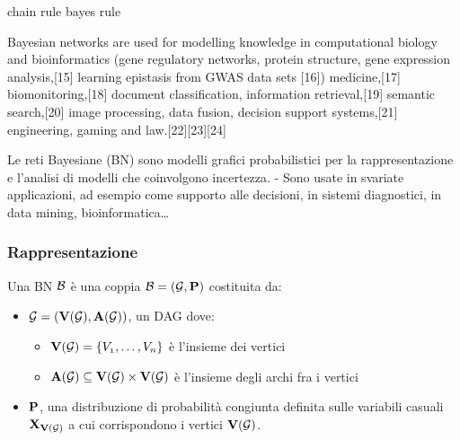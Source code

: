 chain rule
bayes rule

Bayesian networks are used for modelling knowledge in computational biology and bioinformatics (gene regulatory networks, protein structure, gene expression analysis,[15] learning epistasis from GWAS data sets [16]) medicine,[17] biomonitoring,[18] document classification, information retrieval,[19] semantic search,[20] image processing, data fusion, decision support systems,[21] engineering, gaming and law.[22][23][24]

Le reti Bayesiane (BN) sono modelli grafici probabilistici 
per la rappresentazione e l’analisi di modelli che 
coinvolgono incertezza. 
- Sono usate in svariate applicazioni, ad esempio come 
supporto alle decisioni, in sistemi diagnostici, in data 
mining, bioinformatica… 

\subsubsection{Rappresentazione}

\begin{definizione}[\acl{BN}]
Una \acl{BN} $\mathcal{B}$ è una coppia $\mathcal{B}=(\mathcal{G}, \mathbf{P})$ costituita da:
\begin{itemize}
    \item $\mathcal{G}=(\mathbf{V}(\mathcal{G}),\mathbf{A}(\mathcal{G}))$, un \acl{DAG} dove:
    \begin{itemize}
        \item $\mathbf{V}(\mathcal{G})=\{\mathnormal{V_1}, \dotsc, \mathnormal{V_n}\}$ è l'insieme dei vertici
        \item $\mathbf{A}(\mathcal{G})\subseteq\mathbf{V}(\mathcal{G})\times\mathbf{V}(\mathcal{G})$ è l'insieme degli archi fra i vertici
    \end{itemize}
    \item $\mathbf{P}$, una distribuzione di probabilità congiunta definita sulle variabili casuali $\mathbf{X}_{\mathbf{V}(\mathcal{G})}$ a cui corrispondono i vertici $\mathbf{V}(\mathcal{G})$.
\end{itemize}
\end{definizione}

\begin{definizione}[Indipendenza]
\end{definizione} 

\begin{definizione}
\end{definizione} 

